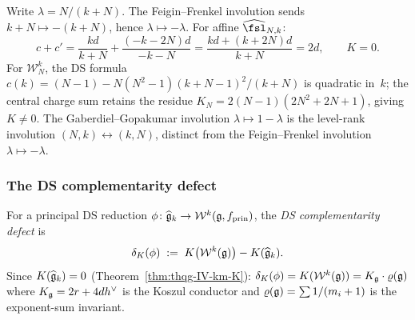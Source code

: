 \begin{computation}
\label{comp:thqg-IV-thooft-complementarity}
Write $\lambda = N/(k+N)$.
The Feigin--Frenkel involution sends
$k + N \mapsto -(k+N)$, hence $\lambda \mapsto -\lambda$.
For affine $\widehat{\fsl}_{N,k}$:
\[
c + c'
= \frac{kd}{k+N} + \frac{(-k-2N)d}{-k-N}
= \frac{kd + (k+2N)d}{k+N}
= 2d,
\qquad
K = 0.
\]
For $\mathcal{W}_N^k$, the DS formula
$c(k) = (N{-}1) - N(N^2{-}1)(k{+}N{-}1)^2/(k{+}N)$
is quadratic in~$k$; the central charge sum retains the residue
$K_N = 2(N{-}1)(2N^2{+}2N{+}1)$, giving $K \neq 0$.
The Gaberdiel--Gopakumar involution
$\lambda \mapsto 1 - \lambda$ is the level-rank involution
$(N,k) \leftrightarrow (k,N)$, distinct from the
Feigin--Frenkel involution $\lambda \mapsto -\lambda$.
\end{computation}

%
%

\subsubsection{The DS complementarity defect}
\label{subsec:thqg-IV-ds-defect}

\begin{definition}
\label{def:ds-complementarity-defect}
For a principal DS reduction
$\phi\colon \widehat{\mathfrak{g}}_k \to \mathcal{W}^k(\mathfrak{g}, f_{\mathrm{prin}})$,
the \emph{DS complementarity defect} is
\begin{equation}\label{eq:ds-defect}
\delta_K(\phi)
\;:=\;
K\bigl(\mathcal{W}^k(\mathfrak{g})\bigr) - K(\widehat{\mathfrak{g}}_k).
\end{equation}
Since $K(\widehat{\mathfrak{g}}_k) = 0$
(Theorem~\ref{thm:thqg-IV-km-K}):
$\delta_K(\phi) = K(\mathcal{W}^k(\mathfrak{g}))
= K_{\mathfrak{g}} \cdot \varrho(\mathfrak{g})$
where $K_{\mathfrak{g}} = 2r + 4dh^\vee$ is the Koszul conductor
and $\varrho(\mathfrak{g}) = \sum 1/(m_i + 1)$ is the exponent-sum
invariant.
\end{definition}

